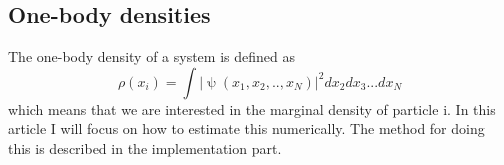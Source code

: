 

\subsection{One-body densities}
The one-body density of a system is defined as
\begin{equation}
    \rho(x_i) = \int |\uppsi(x_1, x_2, ..,x_N)|^2dx_2dx_3...dx_N
\end{equation}
which means that we are interested in the marginal density of particle i. In this article I will focus on how to estimate this numerically. The method for doing this is described in the implementation part. 

\newpage

